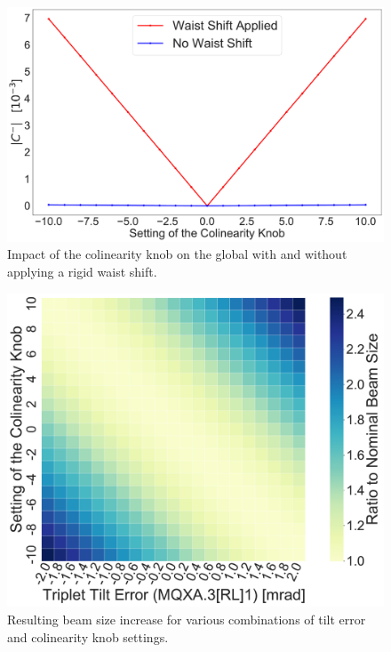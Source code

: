 \begin{figure}[!htb]
    \centering
    \includegraphics*[width=0.99\columnwidth]{Figures/Chapter4/colin_knob_vs_waist_shift.pdf}
    \caption{Impact of the colinearity knob on the global \AbsCminus with and without applying a rigid waist shift.}
    \label{fig:knob_to_cminus_with_waist}
\end{figure}


\begin{figure}[!htb]
    \centering
    \includegraphics*[width=0.99\columnwidth]{Figures/Chapter4/beam_size_colin_compensation.pdf}
    \caption{Resulting beam size increase for various combinations of tilt error and colinearity knob settings.}
    \label{fig:beam_size_comp}
\end{figure}

